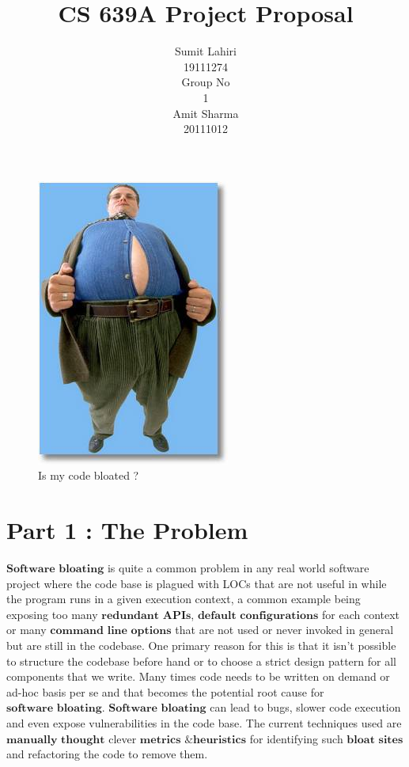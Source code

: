 \documentclass{article} %
\title{CS 639A Project Proposal}
\author{
Sumit Lahiri \\
19111274 \\
\And
Group No\\
1\\
\And
Amit Sharma \\
20111012\\
}
\begin{document}
\maketitle

\begin{figure}[htbp]
\centerline{\includegraphics[scale=0.2]{blaot.jpg}}
\caption{Is my code bloated ?}
\label{fig}
\end{figure}

\section*{Part 1 : The Problem}
$\textbf{Software bloating}$ is quite a common problem in any real world software project where the code base is plagued with LOCs that are not useful in while the program runs in a given execution context, a common example being exposing too many $\textbf{redundant APIs}$, $\textbf{default configurations}$ for each context or many $\textbf{command line options}$ that are not used or never invoked in general but are still in the codebase. One primary reason for this is that it isn't possible to structure the codebase before hand or to choose a strict design pattern for all components that we write. Many times code needs to be written on demand or ad-hoc basis per se and that becomes the potential root cause for $\textbf{software bloating}$. $\textbf{Software bloating}$ can lead to bugs, slower code execution and even expose vulnerabilities in the code base. The current techniques used are $\textbf{manually thought}$ clever $\textbf{metrics \& heuristics}$ for identifying such $\textbf{bloat sites}$ and refactoring the code to remove them. 
\end{document}
